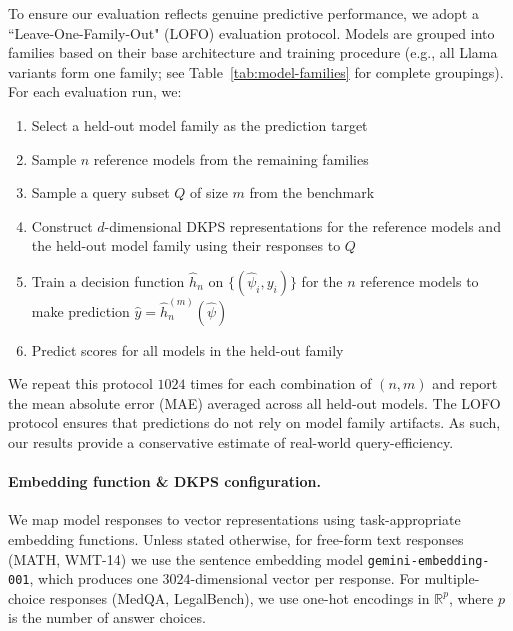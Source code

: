 To ensure our evaluation reflects genuine predictive performance, we adopt a ``Leave-One-Family-Out" (LOFO) evaluation protocol.
Models are grouped into families based on their base architecture and training procedure (e.g., all Llama variants form one family; see Table~\ref{tab:model-families} for complete groupings).
For each evaluation run, we:
\begin{enumerate}[label=(\roman*), itemsep=0pt, topsep=2pt, parsep=0pt]
    \item Select a held-out model family as the prediction target
    \item Sample $n$ reference models from the remaining families
    \item Sample a query subset $Q$ of size $m$ from the benchmark
    \item Construct $d$-dimensional DKPS representations for the reference models and the held-out model family using their responses to $Q$
    \item Train a decision function $\hat{h}_n$ on $\{(\widehat{\psi}_i, y_i)\}$ for the $n$ reference models to make prediction $\hat{y} = \hat{h}_{n}^{(m)}(\widehat{\psi})$
    \item Predict scores for all models in the held-out family
\end{enumerate}
We repeat this protocol $ 1024 $ times for each combination of $(n, m)$ and report the mean absolute error (MAE) averaged across all held-out models.
The LOFO protocol ensures that predictions do not rely on model family artifacts. As such, our results provide a conservative estimate of real-world query-efficiency.

\paragraph{Embedding function \& DKPS configuration.}
We map model responses to vector representations using task-appropriate embedding functions.
Unless stated otherwise, for free-form text responses (MATH, WMT-14) we use the sentence embedding model \texttt{gemini-embedding-001}, which produces one $3024$-dimensional vector per response.
For multiple-choice responses (MedQA, LegalBench), we use one-hot encodings in $\mathbb{R}^{p}$, where $p$ is the number of answer choices.

